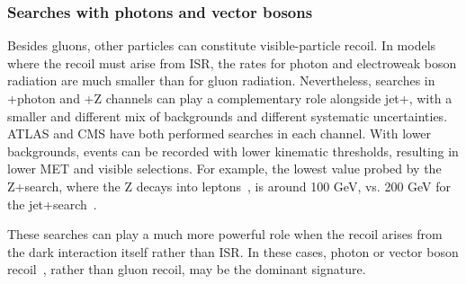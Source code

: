 \subsubsection{Searches with photons and vector bosons}
\label{subsub:monoV}



Besides gluons, other particles can constitute visible-particle recoil.
In models where the recoil must arise from ISR, the rates for photon and electroweak boson radiation are much smaller than for gluon radiation.
Nevertheless, searches in \MET+photon and \MET+Z channels can play a complementary role alongside jet+\MET, with a smaller and different mix of backgrounds and different systematic uncertainties.
ATLAS and CMS have both performed searches in each channel.
With lower backgrounds, events can be recorded with lower kinematic thresholds, resulting in lower MET and visible \pt{} selections.
For example, the lowest \MET value probed by the Z+\MET search, where the Z decays into leptons~\cite{Sirunyan:2017qfc,Aaboud:2017bja}, is around 100 GeV, vs. 
200 GeV for the jet+\MET search~\cite{Sirunyan:2017jix}.

These searches can play a much more powerful role when the recoil arises from the dark interaction itself rather than ISR.
In these cases, photon or vector boson recoil~\cite{Birkedal:2004xn,Petriello:2008pu,Carpenter:2012rg,Bell:2012rg}, rather than gluon recoil, may be the dominant signature.

